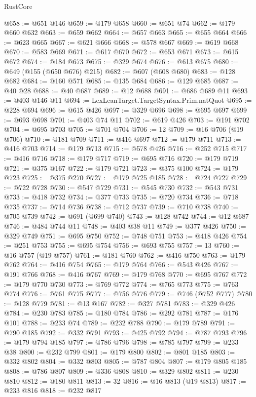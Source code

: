 \begin{lexlean}{RustCore}
\begin{coremodule}
@658 := @651 @146
@659 := @179 @658
@660 := @651 @74
@662 := @179 @660 @632
@663 := @659 @662
@664 := @657 @663
@665 := @655 @664
@666 := @623 @665
@667 := @621 @666
@668 := @578 @667
@669 := @619 @668
@670 := @583 @669
@671 := @617 @670
@672 := @653 @671
@673 := @615 @672
@674 := @184 @673
@675 := @329 @674
@676 := @613 @675
@680 := @649 (@155 (@650 @676) @215)
@682 := @607 (@608 @680)
@683 := @128 @682
@684 := @160 @571
@685 := @135 @684
@686 := @129 @685
@687 := @40 @28
@688 := @40 @687
@689 := @12 @688
@691 := @686 @689 @11
@693 := @403 @146 @11
@694 := LexLeanTarget.TargetSyntax.Prim.natQuot
@695 := @228 @694
@696 := @615 @426
@697 := @329 @696
@698 := @695 @697
@699 := @693 @698
@701 := @403 @74 @11
@702 := @619 @426
@703 := @191 @702
@704 := @695 @703
@705 := @701 @704
@706 := 12
@709 := @16 @706 (@19 @706)
@710 := @181 @709
@711 := @416 @697
@712 := @179 @711
@713 := @416 @703
@714 := @179 @713
@715 := @578 @426
@716 := @252 @715
@717 := @416 @716
@718 := @179 @717
@719 := @695 @716
@720 := @179 @719
@721 := @375 @167
@722 := @179 @721
@723 := @375 @100
@724 := @179 @723
@725 := @375 @270
@727 := @179 @725 @185
@728 := @724 @727
@729 := @722 @728
@730 := @547 @729
@731 := @545 @730
@732 := @543 @731
@733 := @418 @732
@734 := @377 @733
@735 := @720 @734
@736 := @718 @735
@737 := @714 @736
@738 := @712 @737
@739 := @710 @738
@740 := @705 @739
@742 := @691 (@699 @740)
@743 := @128 @742
@744 := @12 @687
@746 := @484 @744 @11
@748 := @403 @38 @11
@749 := @377 @426
@750 := @329 @749
@751 := @695 @750
@752 := @748 @751
@753 := @418 @426
@754 := @251 @753
@755 := @695 @754
@756 := @693 @755
@757 := 13
@760 := @16 @757 (@19 @757)
@761 := @181 @760
@762 := @416 @750
@763 := @179 @762
@764 := @416 @754
@765 := @179 @764
@766 := @543 @426
@767 := @191 @766
@768 := @416 @767
@769 := @179 @768
@770 := @695 @767
@772 := @179 @770 @730
@773 := @769 @772
@774 := @765 @773
@775 := @763 @774
@776 := @761 @775
@777 := @756 @776
@779 := @746 (@752 @777)
@780 := @128 @779
@781 := @13 @167
@782 := @327 @781
@783 := @329 @426
@784 := @230 @783
@785 := @180 @784
@786 := @292 @781
@787 := @176 @101
@788 := @233 @74
@789 := @232 @788
@790 := @179 @789
@791 := @790 @185
@792 := @332 @791
@793 := @425 @792
@794 := @787 @793
@796 := @179 @794 @185
@797 := @786 @796
@798 := @785 @797
@799 := @233 @38
@800 := @232 @799
@801 := @179 @800
@802 := @801 @185
@803 := @332 @802
@804 := @332 @803
@805 := @787 @804
@807 := @179 @805 @185
@808 := @786 @807
@809 := @336 @808
@810 := @329 @802
@811 := @230 @810
@812 := @180 @811
@813 := 32
@816 := @16 @813 (@19 @813)
@817 := @233 @816
@818 := @232 @817

\end{coremodule}
\end{lexlean}
